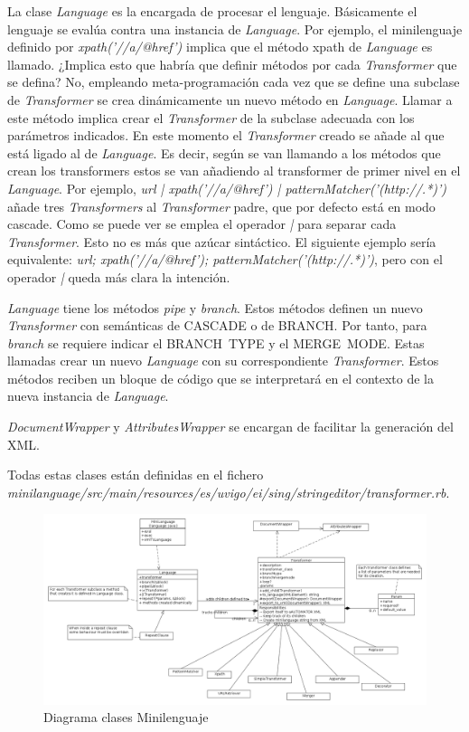La clase \emph{Language} es la encargada de procesar el
lenguaje. Básicamente el lenguaje se evalúa contra una instancia de
\emph{Language}. Por ejemplo, el minilenguaje definido por
\emph{xpath('//a/@href')} implica que el método xpath de
\emph{Language} es llamado. ¿Implica esto que habría que definir
métodos por cada \emph{Transformer} que se defina? No, empleando
meta-programación\cite{METAPROGRAMMING} cada vez que se define una
subclase de \emph{Transformer} se crea dinámicamente un nuevo método
en \emph{Language}. Llamar a este método implica crear el
\emph{Transformer} de la subclase adecuada con los parámetros
indicados. En este momento el \emph{Transformer} creado se añade al
que está ligado al de \emph{Language}. Es decir, según se van llamando
a los métodos que crean los transformers estos se van añadiendo al
transformer de primer nivel en el \emph{Language}. Por ejemplo,
\emph{url | xpath('//a/@href') | patternMatcher('(http://.*)')} añade
tres \emph{Transformers} al \emph{Transformer} padre, que por defecto
está en modo cascade. Como se puede ver se emplea el operador \emph{|}
para separar cada \emph{Transformer}. Esto no es más que azúcar
sintáctico. El siguiente ejemplo sería equivalente: \emph{url;
  xpath('//a/@href'); patternMatcher('(http://.*)')}, pero con el
operador \emph{|} queda más clara la intención.

\emph{Language} tiene los métodos \emph{pipe} y \emph{branch}. Estos
métodos definen un nuevo \emph{Transformer} con semánticas de CASCADE
o de BRANCH. Por tanto, para \emph{branch} se requiere indicar el
BRANCH~TYPE y el MERGE~MODE. Estas llamadas crear un nuevo
\emph{Language} con su correspondiente \emph{Transformer}. Estos
métodos reciben un bloque de código que se interpretará en el contexto
de la nueva instancia de \emph{Language}.

\emph{DocumentWrapper} y \emph{AttributesWrapper} se encargan de
facilitar la generación del XML.

Todas estas clases están definidas en el fichero
\emph{minilanguage/src/main/resources/es/uvigo/ei/sing/stringeditor/transformer.rb}.

\begin{landscape}
\begin{figure}[hp]
\includegraphics[width=1.4\textwidth]{chapters/technical-manual/diagrams/clases_minilenguaje.png}
\caption{Diagrama clases Minilenguaje}\label{diagrama_clases_minilenguaje}
\end{figure}
\end{landscape}

